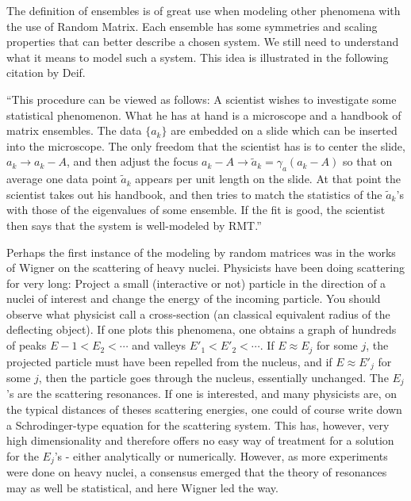 The definition of ensembles is of great use when modeling other phenomena with the use of Random Matrix. Each ensemble has some symmetries and scaling properties that can better describe a chosen system. We still need to understand what it means to model such a system. This idea is illustrated in the following citation by Deif.

\begin{sic}
	\cite{deift2006universalitymathematicalphysicalsystems}
	\enquote{This procedure can  be viewed as follows: A scientist wishes to investigate some statistical phenomenon. What he has at hand is a microscope and a handbook of matrix ensembles. The data $\{a_k\}$ are embedded on a slide which can be inserted into the microscope. The only freedom that the scientist has is to center the slide, $a_k \rightarrow a_k - A$, and then adjust the focus $a_k - A \rightarrow \tilde{a}_k = \gamma_a(a_k - A)$ so that on average one data point $\tilde{a}_k$ appears per unit length on the slide. At that point the scientist takes out his handbook, and then tries to match the statistics of the $\tilde{a}_k$’s with those of the eigenvalues of some ensemble. If the fit is good, the scientist then says that the system is well-modeled by RMT.}
\end{sic}

Perhaps the first instance of the modeling by random matrices was in the works of Wigner on the scattering of heavy nuclei. Physicists have been doing scattering for very long: Project a small (interactive or not) particle in the direction of a nuclei of interest and change the energy of the incoming particle. You should observe what physicist call a cross-section (an classical equivalent radius of the deflecting object). If one plots this phenomena, one obtains a graph of hundreds of peaks $E-1 < E_2 < \cdots$  and valleys $E'_1 < E'_2 < \cdots $. If $E \approx E_j$ for some $j$, the projected particle must have been repelled from the nucleus, and if $E \approx E'_j$ for some $j$, then the particle goes through the nucleus, essentially unchanged. The $E_j$’s are the scattering resonances. If one is interested, and many physicists are, on the typical distances of theses scattering energies, one could of course write down a Schrodinger-type equation for the scattering system. This has, however, very high dimensionality and therefore offers no easy way of treatment for a solution for the $E_j$’s - either analytically or numerically. However, as more experiments were done on heavy nuclei, a consensus emerged that the theory of resonances may as well be statistical, and here Wigner led the way.

